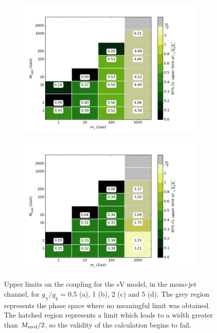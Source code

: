 \begin{figure}[t]
\begin{subfigure}[t]{0.45\textwidth}
      \includegraphics[width=1.\textwidth]{figures/grid_basepoints_SVD_rat2_monojet.png}
      \caption{}
    \end{subfigure}
    \begin{subfigure}[t]{0.45\textwidth}
      \centering
      \includegraphics[width=1.\textwidth]{figures/grid_basepoints_SVD_rat5_monojet.png}
      \caption{}
    \end{subfigure}
    \caption{Upper limits on the coupling for the sV model, in the mono-jet channel, for $g_{\chi} / g_q$ = 0.5 (a), 1 (b), 2 (c) and 5 (d). The grey region represents the phase space where no meaningful limit was obtained. The hatched region represents a limit which leads to a width greater than $M_{\mathrm{med}} / 2$, so the validity of the calculation begins to fail.}
    \label{fig:Monojet_SVD_couplinglimit}
\end{figure}

